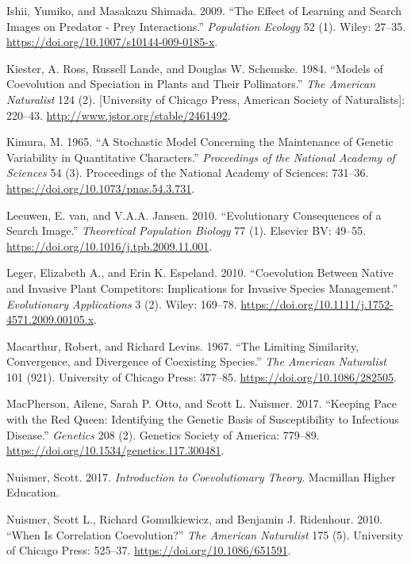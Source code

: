 \documentclass[]{article}
\begin{document}
\leavevmode\hypertarget{ref-Ishii2009}{}%
Ishii, Yumiko, and Masakazu Shimada. 2009. ``The Effect of Learning and
Search Images on Predator - Prey Interactions.'' \emph{Population
Ecology} 52 (1). Wiley: 27--35.
\url{https://doi.org/10.1007/s10144-009-0185-x}.

\leavevmode\hypertarget{ref-Kiester1984}{}%
Kiester, A. Ross, Russell Lande, and Douglas W. Schemske. 1984. ``Models
of Coevolution and Speciation in Plants and Their Pollinators.''
\emph{The American Naturalist} 124 (2). {[}University of Chicago Press,
American Society of Naturalists{]}: 220--43.
\url{http://www.jstor.org/stable/2461492}.

\leavevmode\hypertarget{ref-Kimura1965}{}%
Kimura, M. 1965. ``A Stochastic Model Concerning the Maintenance of
Genetic Variability in Quantitative Characters.'' \emph{Proceedings of
the National Academy of Sciences} 54 (3). Proceedings of the National
Academy of Sciences: 731--36.
\url{https://doi.org/10.1073/pnas.54.3.731}.

\leavevmode\hypertarget{ref-vanLeeuwen2010}{}%
Leeuwen, E. van, and V.A.A. Jansen. 2010. ``Evolutionary Consequences of
a Search Image.'' \emph{Theoretical Population Biology} 77 (1). Elsevier
BV: 49--55. \url{https://doi.org/10.1016/j.tpb.2009.11.001}.

\leavevmode\hypertarget{ref-Leger2010}{}%
Leger, Elizabeth A., and Erin K. Espeland. 2010. ``Coevolution Between
Native and Invasive Plant Competitors: Implications for Invasive Species
Management.'' \emph{Evolutionary Applications} 3 (2). Wiley: 169--78.
\url{https://doi.org/10.1111/j.1752-4571.2009.00105.x}.

\leavevmode\hypertarget{ref-Macarthur1967}{}%
Macarthur, Robert, and Richard Levins. 1967. ``The Limiting Similarity,
Convergence, and Divergence of Coexisting Species.'' \emph{The American
Naturalist} 101 (921). University of Chicago Press: 377--85.
\url{https://doi.org/10.1086/282505}.

\leavevmode\hypertarget{ref-MacPherson2017}{}%
MacPherson, Ailene, Sarah P. Otto, and Scott L. Nuismer. 2017. ``Keeping
Pace with the Red Queen: Identifying the Genetic Basis of Susceptibility
to Infectious Disease.'' \emph{Genetics} 208 (2). Genetics Society of
America: 779--89. \url{https://doi.org/10.1534/genetics.117.300481}.

\leavevmode\hypertarget{ref-nuismer2017introduction}{}%
Nuismer, Scott. 2017. \emph{Introduction to Coevolutionary Theory}.
Macmillan Higher Education.

\leavevmode\hypertarget{ref-Nuismer2010}{}%
Nuismer, Scott L., Richard Gomulkiewicz, and Benjamin J. Ridenhour.
2010. ``When Is Correlation Coevolution?'' \emph{The American
Naturalist} 175 (5). University of Chicago Press: 525--37.
\url{https://doi.org/10.1086/651591}.
\end{document}
